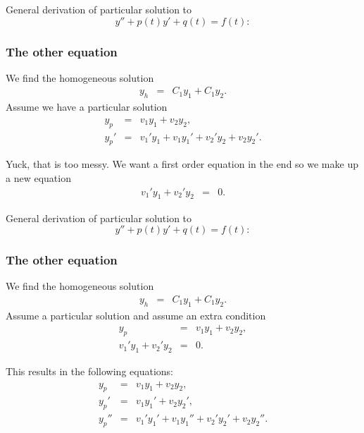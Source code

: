 \begin{frame}
General derivation of particular solution to $$y''+p(t)y'+q(t)=f(t):$$
  \frametitle{The other equation}

  We find the homogeneous solution
  \begin{eqnarray*}
    y_h & = & C_1  y_1 + C_1 y_2.
  \end{eqnarray*}
  Assume we have a particular solution
  \begin{eqnarray*}
    y_p & = & v_1 y_1 + v_2 y_2, \\
    y_p' & = & v_1' y_1 + v_1 y_1' + v_2' y_2 + v_2 y_2'.
  \end{eqnarray*}

  Yuck, that is too messy. We want a first order equation in the end
  so {\color{red}we make up a new equation
  \begin{eqnarray}
    \label{eqn:firstConstraint}
    v_1' y_1 + v_2' y_2 & = & 0.
  \end{eqnarray}}

\end{frame}


\begin{frame}
General derivation of particular solution to $$y''+p(t)y'+q(t)=f(t):$$
  \frametitle{The other equation}

  We find the homogeneous solution
  \begin{eqnarray*}
    y_h & = & C_1  y_1 + C_1 y_2.
  \end{eqnarray*}
  Assume  a particular solution and assume an extra condition
  \begin{eqnarray*}
    y_p & = & v_1 y_1 + v_2 y_2, \\
    v_1' y_1 + v_2' y_2 & = & 0.
  \end{eqnarray*}


  This results in the following equations:
  \begin{eqnarray*}
    y_p   & = & v_1 y_1 + v_2 y_2, \\
    y_p'  & = & v_1 y_1' + v_2 y_2', \\
    y_p'' & = & v_1' y_1' + v_1 y_1'' + v_2' y_2' + v_2 y_2''.
  \end{eqnarray*}


\end{frame}




